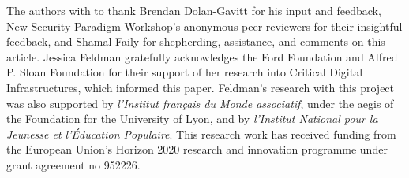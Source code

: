 The authors with to thank Brendan Dolan-Gavitt for his input and feedback, New
Security Paradigm Workshop’s anonymous peer reviewers for their insightful
feedback, and Shamal Faily for shepherding, assistance, and comments on this
article. Jessica Feldman gratefully acknowledges the Ford Foundation and Alfred
P. Sloan Foundation for their support of her research into Critical Digital
Infrastructures, which informed this paper. Feldman’s research with this
project was also supported by \textit{l’Institut français du Monde associatif},
under the aegis of the Foundation for the University of Lyon, and by
\textit{l’Institut National pour la Jeunesse et l'Éducation Populaire}. This
research work has received funding from the European Union’s Horizon 2020
research and innovation programme under grant agreement no 952226.
